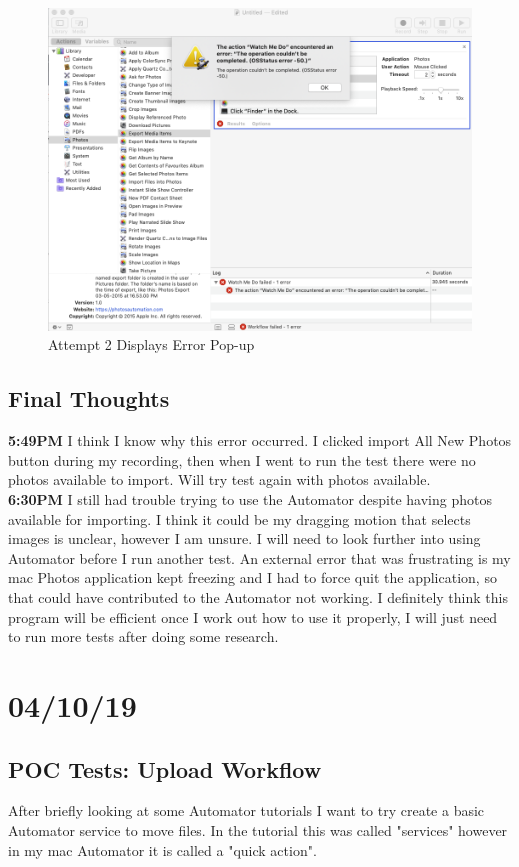 \documentclass{article}
\begin{document}
\begin{figure}[H]
    \centering
    \includegraphics[width=\textwidth]{Images/Automator_2.png}
    \caption{Attempt 2 Displays Error Pop-up}
    \label{fig:my_label}
\end{figure}

\subsection{Final Thoughts}
\textbf{5:49PM} I think I know why this error occurred. I clicked import All New Photos button during my recording, then when I went to run the test there were no photos available to import. Will try test again with photos available. \\
\textbf{6:30PM} I still had trouble trying to use the Automator despite having photos available for importing. I think it could be my dragging motion that selects images is unclear, however I am unsure. I will need to look further into using Automator before I run another test. An external error that was frustrating is my mac Photos application kept freezing and I had to force quit the application, so that could have contributed to the Automator not working. I definitely think this program will be efficient once I work out how to use it properly, I will just need to run more tests after doing some research.

\section{04/10/19}
\subsection{POC Tests: Upload Workflow}
After briefly looking at some Automator tutorials I want to try create a basic Automator service to move files. In the tutorial this was called "services" however in my mac Automator it is called a "quick action". 
\end{document}
